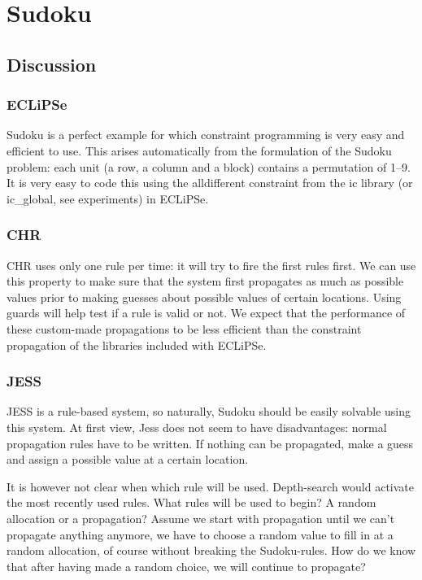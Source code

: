 \section{Sudoku}
\subsection{Discussion}
\subsubsection{ECLiPSe}
Sudoku is a perfect example for which constraint programming is very easy and efficient to use. This arises automatically from the formulation of the Sudoku problem: each unit (a row, a column and a block) contains a permutation of 1--9. It is very easy to code this using the alldifferent constraint from the ic library (or ic\_global, see experiments) in ECLiPSe.

\subsubsection{CHR}
CHR uses only one rule per time: it will try to fire the first rules
first. We can use this property to make sure that the system first
propagates as much as possible values prior to making guesses about
possible values of certain locations. Using guards will help test if a rule is valid or not. We expect that the performance of these custom-made propagations to be less efficient than the constraint propagation of the libraries included with ECLiPSe.


\subsubsection{JESS}
JESS is a rule-based system, so naturally, Sudoku should be easily solvable using this system. 
At first view, Jess does not seem to have disadvantages: normal propagation rules have to be written. If nothing can be propagated, make a guess and assign a possible value at a certain location.

It is however not clear when which rule will be used. Depth-search would activate the most recently used rules. What rules will be used to begin? A random allocation or a propagation? Assume we start with propagation until we can't propagate anything anymore, we have to choose a random value to fill in at a random allocation, of course without breaking the Sudoku-rules. How do we know that after having made a random choice, we will continue to propagate?

